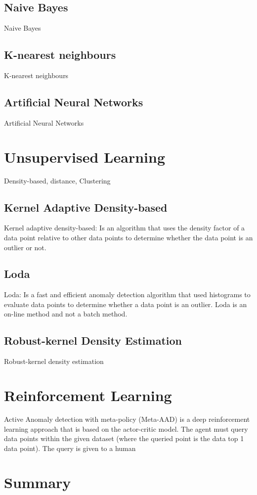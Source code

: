 \subsection{Naive Bayes}
Naive Bayes

\subsection{K-nearest neighbours}
K-nearest neighbours

\subsection{Artificial Neural Networks}
Artificial Neural Networks

\section{Unsupervised Learning}
Density-based, distance, Clustering

\subsection{Kernel Adaptive Density-based}
Kernel adaptive density-based: Is an algorithm that uses the density factor of a data point relative to other data points to determine whether the data point is an outlier or not.

\subsection{Loda}
Loda: Is a fast and efficient anomaly detection algorithm that used histograms to evaluate data points to determine whether a data point is an outlier. Loda is an on-line method and not a batch method.

\subsection{Robust-kernel Density Estimation}
Robust-kernel density estimation

\section{Reinforcement Learning}
Active Anomaly detection with meta-policy (Meta-AAD) is a deep reinforcement learning approach that is based on the actor-critic model. The agent must query data points within the given dataset (where the queried point is the data top 1 data point). The query is given to a human 

\section{Summary}

